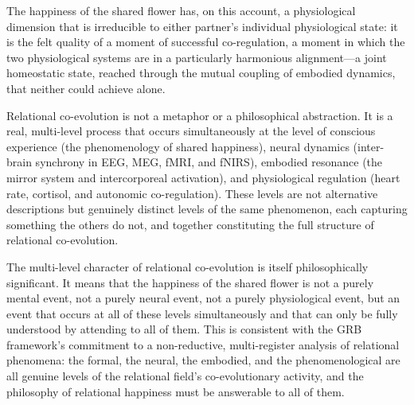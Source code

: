 The happiness of the shared flower has, on this account, a physiological dimension that is irreducible to either partner's individual physiological state: it is the felt quality of a moment of successful co-regulation, a moment in which the two physiological systems are in a particularly harmonious alignment---a joint homeostatic state, reached through the mutual coupling of embodied dynamics, that neither could achieve alone.

\begin{claim}
Relational co-evolution is not a metaphor or a philosophical abstraction. It is a real, multi-level process that occurs simultaneously at the level of conscious experience (the phenomenology of shared happiness), neural dynamics (inter-brain synchrony in EEG, MEG, fMRI, and fNIRS), embodied resonance (the mirror system and intercorporeal activation), and physiological regulation (heart rate, cortisol, and autonomic co-regulation). These levels are not alternative descriptions but genuinely distinct levels of the same phenomenon, each capturing something the others do not, and together constituting the full structure of relational co-evolution.
\end{claim}

The multi-level character of relational co-evolution is itself philosophically significant. It means that the happiness of the shared flower is not a purely mental event, not a purely neural event, not a purely physiological event, but an event that occurs at all of these levels simultaneously and that can only be fully understood by attending to all of them. This is consistent with the GRB framework's commitment to a non-reductive, multi-register analysis of relational phenomena: the formal, the neural, the embodied, and the phenomenological are all genuine levels of the relational field's co-evolutionary activity, and the philosophy of relational happiness must be answerable to all of them.
